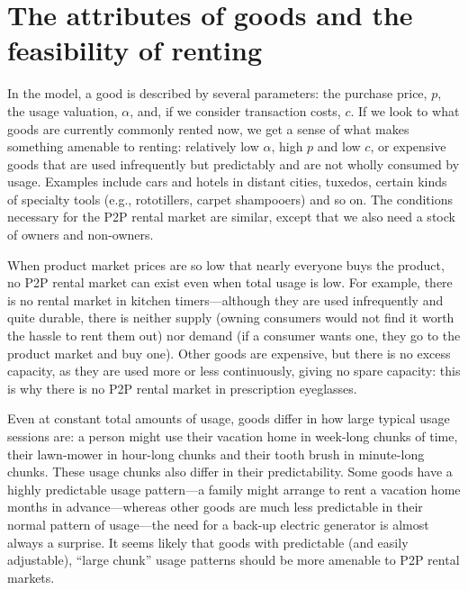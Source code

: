 \documentclass[11pt]{article}
\begin{document}


\section{The attributes of goods and the feasibility of renting} 
In the model, a good is described by several parameters: the purchase price, $p$, the usage valuation, $\alpha$, and, if we consider transaction costs, $c$.  
If we look to what goods are currently commonly rented now, we get a sense of what makes something amenable to renting: 
relatively low $\alpha$, high $p$ and low $c$, or expensive goods that are used infrequently but predictably and are not wholly consumed by usage. 
Examples include cars and hotels in distant cities, tuxedos, certain kinds of specialty tools (e.g., rototillers, carpet shampooers) and so on. 
The conditions necessary for the P2P rental market are similar, except that we also need a stock of owners and non-owners. 

When product market prices are so low that nearly everyone buys the product, no P2P rental market can exist even when total usage is low.  
For example, there is no rental market in kitchen timers---although they are used infrequently and quite durable, there is neither supply (owning consumers would not find it worth the hassle to rent them out) nor demand (if a consumer wants one, they go to the product market and buy one). 
Other goods are expensive, but there is no excess capacity, as they are used more or less continuously, giving no spare capacity: this is why there is no P2P rental market in prescription eyeglasses. 

Even at constant total amounts of usage, goods differ in how large typical usage sessions are: 
a person might use their vacation home in week-long chunks of time, their lawn-mower in hour-long chunks and their tooth brush in minute-long chunks. 
These usage chunks also differ in their predictability. 
Some goods have a highly predictable usage pattern---a family might arrange to rent a vacation home months in advance---whereas other goods are much less predictable in their normal pattern of usage---the need for a back-up electric generator is almost always a surprise.  
It seems likely that goods with predictable (and easily adjustable), ``large chunk'' usage patterns should be more amenable to P2P rental markets. 
\end{document}
